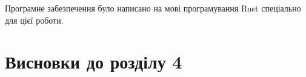 Програмне забезпечення
було написано на мові програмування Rust спеціально для цієї роботи.


\section*{Висновки до розділу 4}
